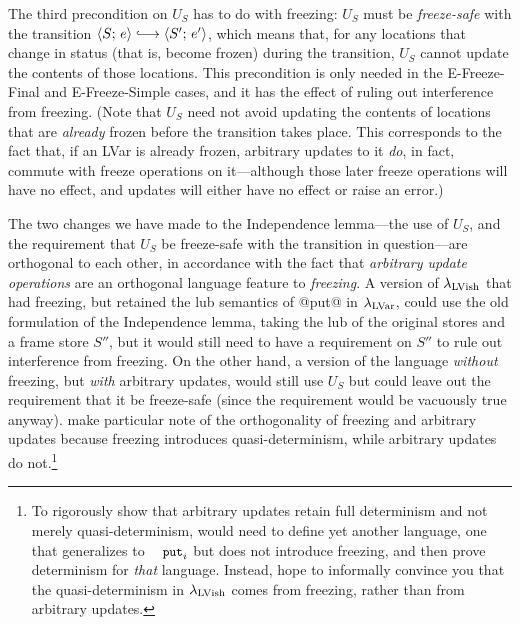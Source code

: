 \DefNonConflictingStoreUpdateOperation

The third precondition on $U_S$ has to do with freezing: $U_S$ must be
\emph{freeze-safe} with the transition $\config{S}{e} \parstepsto
\config{S'}{e'}$, which means that, for any locations that change in
status (that is, become frozen) during the transition, $U_S$ cannot
update the contents of those locations.  This precondition is only
needed in the {\sc E-Freeze-Final} and {\sc E-Freeze-Simple} cases,
and it has the effect of ruling out interference from freezing.  (Note
that $U_S$ need not avoid updating the contents of locations that are
\emph{already} frozen before the transition takes place.  This
corresponds to the fact that, if an LVar is already frozen, arbitrary
updates to it \emph{do}, in fact, commute with freeze operations on
it---although those later freeze operations will have no effect, and
updates will either have no effect or raise an error.)

\DefFreezeSafe

The two changes we have made to the Independence lemma---the use of
$U_S$, and the requirement that $U_S$ be freeze-safe with the
transition in question---are orthogonal to each other, in accordance
with the fact that \emph{arbitrary update operations} are an
orthogonal language feature to \emph{freezing}.  A version of
$\lambda_{\textrm{LVish}}$ that had freezing, but retained the lub semantics of
@put@ in $\lambda_{\textrm{LVar}}$, could use the old formulation of the
Independence lemma, taking the lub of the original stores and a frame
store $S''$, but it would still need to have a requirement on $S''$ to
rule out interference from freezing.  On the other hand, a version of
the language \emph{without} freezing, but \emph{with} arbitrary
updates, would still use $U_S$ but could leave out the requirement
that it be freeze-safe (since the requirement would be vacuously true
anyway).   make particular note of the orthogonality of freezing and
arbitrary updates because freezing introduces quasi-determinism, while
arbitrary updates do not.\footnote{To rigorously show that arbitrary
  updates retain full determinism and not merely quasi-determinism, 
  would need to define yet another language, one that generalizes
   to $\PUTi$ but does not introduce freezing, and then prove
  determinism for \emph{that} language.  Instead,  hope to informally
  convince you that the quasi-determinism in $\lambda_{\textrm{LVish}}$ comes from
  freezing, rather than from arbitrary updates.}

